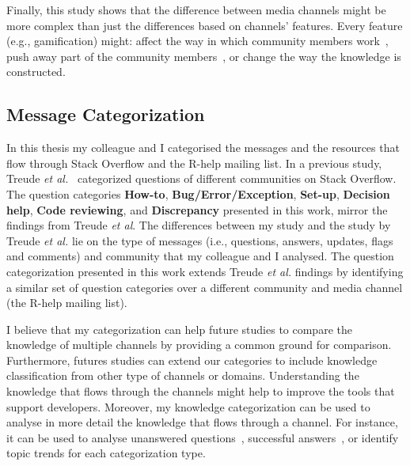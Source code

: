 \documentclass{sig-alternate-05-2015}
\begin{document}
	Finally, this study shows that the difference between media channels might be more complex than just the differences based on channels' features. 
	Every feature (e.g., gamification) might: affect the way in which community members work~\cite{Antin2011,Singer2013}, push away part of the community members~\cite{Vasilescu2013}, or change the way the knowledge is constructed.

\subsection{Message Categorization}

	In this thesis my colleague and I categorised the messages and the resources that flow through Stack Overflow and the R-help mailing list.
	In a previous study, Treude \textit{et al.}~\cite{Treude2011} categorized questions of different communities on Stack Overflow.
	The question categories \textbf{How-to}, \textbf{Bug/Error/Exception}, \textbf{Set-up}, \textbf{Decision help}, \textbf{Code reviewing}, and \textbf{Discrepancy} presented in this work, mirror the findings from Treude \textit{et al}. 
	The differences between my study and the study by Treude \textit{et al.} lie on the type of messages (i.e., questions, answers, updates, flags and comments) and community that my colleague and I analysed. 
	The question categorization presented in this work extends Treude \textit{et al.} findings by identifying a similar set of question categories over a different community and media channel (the R-help mailing list).


	I believe that my categorization can help future studies to compare the knowledge of multiple channels by providing a common ground for comparison. 
	Furthermore, futures studies can extend our categories to include knowledge classification from other type of channels or domains. 
	Understanding the knowledge that flows through the channels might help to improve the tools that support developers. 
	Moreover, my knowledge categorization can be used to analyse in more detail the knowledge that flows through a channel. 
	For instance, it can be used to analyse unanswered questions~\cite{Asaduzzaman2013}, successful answers~\cite{Calefato2015}, or identify topic trends for each categorization type.
\end{document}
